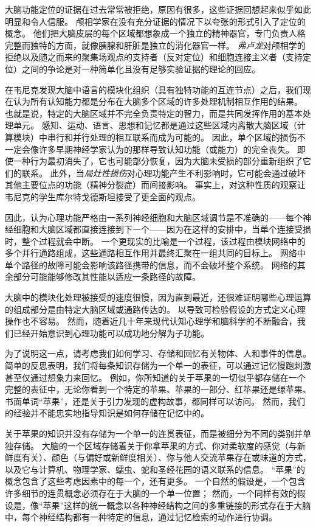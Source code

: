 大脑功能定位的证据在过去常常被拒绝，原因有很多，这些证据回想起来似乎如此明显和令人信服。
颅相学家在没有充分证据的情况下以夸张的形式引入了定位的概念。
他们把大脑皮层的每个区域都想象成一个独立的精神器官，专门负责人格完整而独特的方面，就像胰腺和肝脏是独立的消化器官一样。
\textit{弗卢龙}对颅相学的拒绝以及随之而来的聚集场观点的支持者（反对定位）和细胞连接主义者（支持定位）之间的争论是对一种简单化且没有足够实验证据的理论的回应。


在韦尼克发现大脑中语言的模块化组织（具有独特功能的互连节点）之后，我们现在认为所有认知能力都是分布在大脑多个区域的许多处理机制相互作用的结果。
也就是说，特定的大脑区域并不完全负责特定的智力，而是共同发挥作用的基本处理单元。
感知、运动、语言、思想和记忆都是通过这些区域内离散大脑区域（计算模块）中串行和并行处理的相互联系而成为可能的。
因此，单个区域的损伤不一定会像许多早期神经学家认为的那样导致认知功能（或能力）的完全丧失。
即使一种行为最初消失了，它也可能部分恢复，因为大脑未受损的部分重新组织了它们的联系。
此外，当\textit{局灶性损伤}对心理功能产生不利影响时，它可能会通过破坏其他主要位点的功能（精神分裂症）而间接影响。
事实上，对这种性质的观察让韦尼克的学生库尔特戈德斯坦接受了更全面的观点。


因此，认为心理功能严格由一系列神经细胞和大脑区域调节是不准确的——每个神经细胞和大脑区域都直接连接到下一个——因为在这样的安排中，当单个连接受损时，整个过程就会中断。
一个更现实的比喻是一个过程，该过程由模块网络中的多个并行通路组成，这些通路相互作用并最终汇聚在一组共同的目标上。
网络中单个路径的故障可能会影响该路径携带的信息，而不会破坏整个系统。
网络的其余部分可能能够修改其性能以适应一条路径的故障。


大脑中的模块化处理被接受的速度很慢，因为直到最近，还很难证明哪些心理运算的组成部分是由特定大脑区域或通路传达的。
以导致可检验假设的方式定义心理操作也不容易。
然而，随着近几十年来现代认知心理学和脑科学的不断融合，我们已经开始意识到心理功能可以成功地分解为子功能。


为了说明这一点，请考虑我们如何学习、存储和回忆有关物体、人和事件的信息。
简单的反思表明，我们将每条知识存储为一个单一的表征，可以通过记忆慢跑刺激甚至仅通过想象力来回忆。
例如，你所知道的关于苹果的一切似乎都存储在一个完整的表征中，无论你看到一个特定的苹果、苹果的一部分、红苹果还是绿苹果、书面单词“苹果”，还是关于引力发现的虚构故事，都同样可以访问。
然而，我们的经验并不能忠实地指导知识是如何存储在记忆中的。


关于苹果的知识并没有存储为一个单一的连贯表征，而是被细分为不同的类别并单独存储。
大脑的一个区域存储着关于你拿苹果的方式、你对柔软度的感觉（与新鲜度有关）、颜色（与偏好或新鲜度相关）、你与他人交流苹果存在或味道的方式，以及它与计算机、物理学家、蠕虫、蛇和圣经花园的语义联系的信息。
“苹果”的概念包含了这些考虑因素中的每一个，还有更多。
一个自然的假设是，一个包含许多细节的连贯概念必须存在于大脑的一个单一位置；
然而，一个同样有效的假设是，像“苹果”这样的统一概念以各种神经结构之间的多重链接的形式存在于大脑中，每个神经结构都有一种特定的信息，通过记忆检索的动作进行协调。


